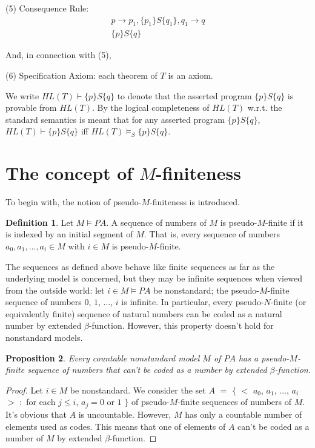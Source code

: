 \documentclass[a4paper,11pt]{article}
\begin{document}
(5) Consequence Rule:
\begin{displaymath}
\begin{array}{c}
  p\rightarrow p_1,\{p_1\}S\{q_1\},q_1\rightarrow q \\
  \hline
  \{p\}S\{q\}
\end{array}
\end{displaymath}

And, in connection with (5),

(6) Specification Axiom: each theorem of $T$ is an axiom.

We write $HL(T)\vdash \{p\}S\{q\}$ to denote that the asserted program $\{p\}S\{q\}$ is provable from $HL(T)$. By the logical completeness of $HL(T)$ w.r.t. the standard semantics is meant that for any asserted program $\{p\}S\{q\}$, $HL(T)\vdash \{p\}S\{q\}$ iff $HL(T)\models_S \{p\}S\{q\}$.

\section{The concept of $M$-finiteness}

To begin with, the notion of pseudo-$M$-finiteness is introduced.

\theoremstyle{definition}
\newtheorem{definition_of_pseudo_M_finiteness}{Definition}[section]
\begin{definition_of_pseudo_M_finiteness}
  Let $M\models PA$. A sequence of numbers of $M$ is pseudo-$M$-finite if it is indexed by an initial segment of $M$. That is, every sequence of numbers $a_0,a_1,\ldots,a_i\in M$ with $i\in M$ is pseudo-$M$-finite.
\end{definition_of_pseudo_M_finiteness}

The sequences as defined above behave like finite sequences as far as the underlying model is concerned, but they may be infinite sequences when viewed from the outside world: let $i\in M\models PA$ be nonstandard; the pseudo-$M$-finite sequence of numbers $0$, $1$, $\ldots$, $i$ is infinite. In particular, every pseudo-$N$-finite (or equivalently finite) sequence of natural numbers can be coded as a natural number by extended $\beta$-function. However, this property doesn't hold for nonstandard models.

\theoremstyle{plain}
\newtheorem{pseudo_$M$_finite_is_uncodified}[definition_of_pseudo_M_finiteness]{Proposition}
\begin{pseudo_$M$_finite_is_uncodified}\label{pseudo_$M$_finite_is_uncodified}
  Every countable nonstandard model $M$ of $PA$ has a pseudo-$M$-finite sequence of numbers that can't be coded as a number by extended $\beta$-function.
\end{pseudo_$M$_finite_is_uncodified}
\begin{proof}
  Let $i\in M$ be nonstandard. We consider the set $A$ $=$ $\{$ $<$ $a_0$, $a_1$, $\ldots$, $a_i$ $>$ $:$ for each $j\leq i$, $a_j = 0$ or $1$ $\}$ of pseudo-$M$-finite sequences of numbers of $M$. It's obvious that $A$ is uncountable. However, $M$ has only a countable number of elements used as codes. This means that one of elements of $A$ can't be coded as a number of $M$ by extended $\beta$-function.
\end{proof}
\end{document}
